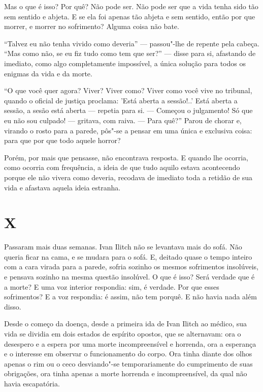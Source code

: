 Mas o que é isso? Por quê? Não pode ser. Não pode ser que a vida tenha
sido tão sem sentido e abjeta. E se ela foi apenas tão abjeta e sem
sentido, então por que morrer, e morrer no sofrimento? Alguma coisa não
bate.

``Talvez eu não tenha vivido como deveria'' --- passou"-lhe de repente pela
cabeça. ``Mas como não, se eu fiz tudo como tem que ser?'' --- disse para
si, afastando de imediato, como algo completamente impossível, a única
solução para todos os enigmas da vida e da morte.

``O que você quer agora? Viver? Viver como? Viver como você vive no
tribunal, quando o oficial de justiça proclama: 'Está aberta a
sessão!..' Está aberta a sessão, a sesão está aberta --- repetia para si.
--- Começou o julgamento! Só que eu não sou culpado! --- gritava, com raiva.
--- Para quê?'' Parou de chorar e, virando o rosto para a parede, pôs"-se a
pensar em uma única e exclusiva coisa: para que por que todo aquele
horror?

Porém, por mais que pensasse, não encontrava resposta. E quando lhe
ocorria, como ocorria com frequência, a ideia de que tudo aquilo estava
acontecendo porque ele não vivera como deveria, recodava de imediato
toda a retidão de sua vida e afastava aquela ideia estranha.

\section{X}

Passaram mais duas semanas. Ivan Ilitch não se levantava mais do sofá.
Não queria ficar na cama, e se mudara para o sofá. E, deitado quase o
tempo inteiro com a cara virada para a parede, sofria sozinho os mesmos
sofrimentos insolúveis, e pensava sozinho na mesma questão insolúvel. O
que é isso? Será verdade que é a morte? E uma voz interior respondia:
sim, é verdade. Por que esses sofrimentos? E a voz respondia: é assim,
não tem porquê. E não havia nada além disso.

Desde o começo da doença, desde a primeira ida de Ivan Ilitch ao médico,
sua vida se dividia em dois estados de espírito opostos, que se
alternavam: ora o desespero e a espera por uma morte incompreensível e
horrenda, ora a esperança e o interesse em observar o funcionamento do
corpo. Ora tinha diante dos olhos apenas o rim ou o ceco desviando"-se
temporariamente do cumprimento de suas obrigações, ora tinha apenas a
morte horrenda e incompreensível, da qual não havia escapatória.

